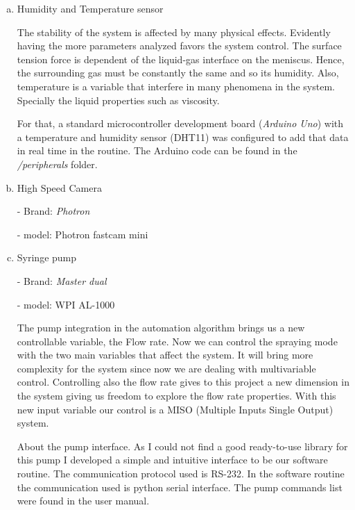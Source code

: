 \begin{enumerate}[a)]
  \item Humidity and Temperature sensor
  
  The stability of the system is affected by many physical effects. Evidently having the more parameters analyzed favors the system control.
  The surface tension force is dependent of the liquid-gas interface on the meniscus. Hence, the surrounding gas must be constantly the same and so its humidity.
  Also, temperature is a variable that interfere in many phenomena in the system. Specially the liquid properties such as viscosity.

  For that, a standard microcontroller development board (\emph{Arduino Uno}) with a temperature and humidity sensor (DHT11) was configured to add that data in real time in the routine.
  The Arduino code can be found in the \emph{/peripherals} folder.
  

  \item High Speed Camera 
  
  - Brand: \emph{Photron}

  - model: Photron fastcam mini


  
  \item Syringe pump
  
  - Brand: \emph{Master dual}

  - model: WPI AL-1000

  The pump integration in the automation algorithm brings us a new controllable variable, the Flow rate. Now we can control the spraying mode with the
  two main variables that affect the system. 
  It will bring more complexity for the system since now we are dealing with multivariable control.
  Controlling also the flow rate gives to this project a new dimension in the system giving us freedom to explore the flow rate properties.
  With this new input variable our control is a MISO (Multiple Inputs Single Output) system.

  About the pump interface. As I could not find a good ready-to-use library for this pump I developed a simple and intuitive interface to be our software routine.
  The communication protocol used is RS-232. In the software routine the communication used is python serial interface. The pump commands list were found in the user manual.


  \end{enumerate}


